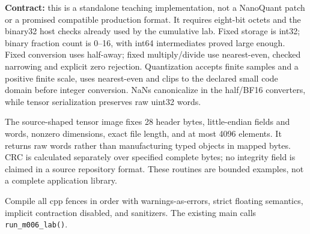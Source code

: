 \textbf{Contract:} this is a standalone teaching implementation, not a NanoQuant patch or a promised compatible production format. It requires eight-bit octets and the binary32 host checks already used by the cumulative lab. Fixed storage is int32; binary fraction count is 0--16, with int64 intermediates proved large enough. Fixed conversion uses half-away; fixed multiply/divide use nearest-even, checked narrowing and explicit zero rejection. Quantization accepts finite samples and a positive finite scale, uses nearest-even and clips to the declared small code domain before integer conversion. NaNs canonicalize in the half/BF16 converters, while tensor serialization preserves raw uint32 words.

The source-shaped tensor image fixes 28 header bytes, little-endian fields and words, nonzero dimensions, exact file length, and at most 4096 elements. It returns raw words rather than manufacturing typed objects in mapped bytes. CRC is calculated separately over specified complete bytes; no integrity field is claimed in a source repository format. These routines are bounded examples, not a complete application library.

Compile all cpp fences in order with warnings-as-errors, strict floating semantics, implicit contraction disabled, and sanitizers. The existing main calls \texttt{run\_m006\_lab()}.

